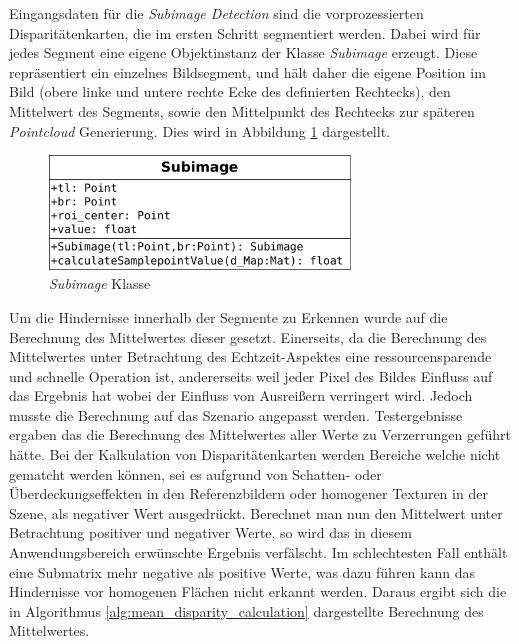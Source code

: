 \noindent
Eingangsdaten für die \emph{Subimage Detection} sind die vorprozessierten Disparitätenkarten, die im ersten Schritt segmentiert werden. Dabei wird für jedes Segment eine eigene Objektinstanz der Klasse \emph{Subimage} erzeugt. Diese repräsentiert ein einzelnes Bildsegment, und hält daher die eigene Position im Bild (obere linke und untere rechte Ecke des definierten Rechtecks), den Mittelwert des Segments, sowie den Mittelpunkt des Rechtecks zur späteren \emph{Pointcloud} Generierung. Dies wird in Abbildung \ref{fig:subimage_class} dargestellt.\\

\begin{figure}[h]
	\begin{center}
		\includegraphics[width=8cm]{img/subimage_class}
	\end{center}
	\caption{\emph{Subimage} Klasse}
	\label{fig:subimage_class}
\end{figure}

\noindent
Um die Hindernisse innerhalb der Segmente zu Erkennen wurde auf die Berechnung des Mittelwertes dieser gesetzt. Einerseits, da die Berechnung des Mittelwertes unter Betrachtung des Echtzeit-Aspektes eine ressourcensparende und schnelle Operation ist, andererseits weil jeder Pixel des Bildes Einfluss auf das Ergebnis hat wobei der Einfluss von Ausreißern verringert wird. Jedoch musste die Berechnung auf das Szenario angepasst werden. Testergebnisse ergaben das die Berechnung des Mittelwertes aller Werte zu Verzerrungen geführt hätte. Bei der Kalkulation von Disparitätenkarten werden Bereiche welche nicht gematcht werden können, sei es aufgrund von Schatten- oder Überdeckungseffekten in den Referenzbildern oder homogener Texturen in der Szene, als negativer Wert ausgedrückt. Berechnet man nun den Mittelwert unter Betrachtung positiver und negativer Werte, so wird das in diesem Anwendungsbereich erwünschte Ergebnis verfälscht. Im schlechtesten Fall enthält eine Submatrix mehr negative als positive Werte, was dazu führen kann das Hindernisse vor homogenen Flächen nicht erkannt werden. Daraus ergibt sich die in Algorithmus \ref{alg:mean_disparity_calculation} dargestellte Berechnung des Mittelwertes.\\


